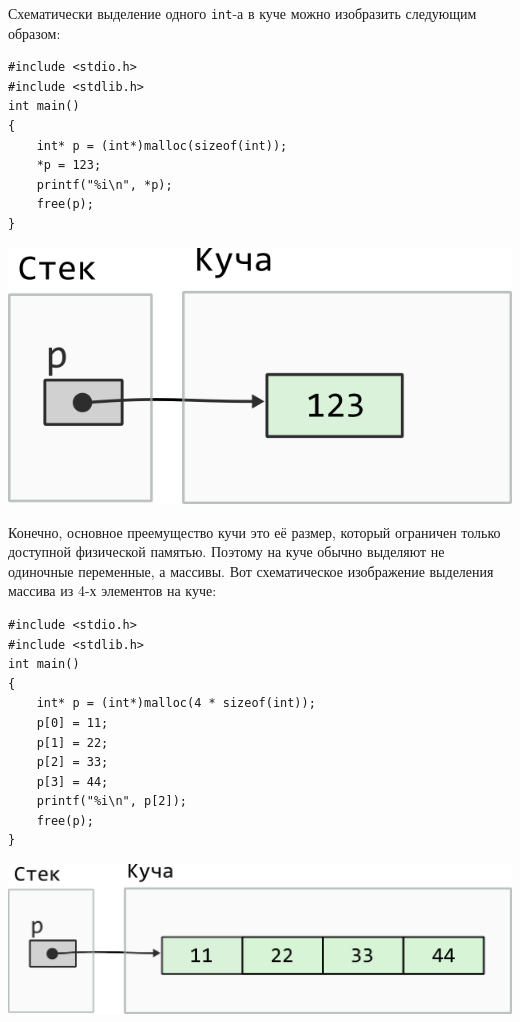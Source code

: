 \documentclass[10pt]{article}
\begin{document}
Схематически выделение одного \texttt{int}-а в куче можно изобразить следующим образом:
 
 
\noindent\begin{minipage}{.50\textwidth}
\begin{lstlisting}
#include <stdio.h>
#include <stdlib.h>
int main()
{
    int* p = (int*)malloc(sizeof(int));
    *p = 123;
    printf("%i\n", *p);
    free(p);
}
\end{lstlisting}
\end{minipage}\hfill
\begin{minipage}{.40\textwidth}
\includegraphics[scale=0.7]{../images/malloc_class_tasks/heap_int.png}
\end{minipage} 

Конечно, основное преемущество кучи это её размер, который ограничен только доступной физической памятью. Поэтому на куче обычно выделяют не одиночные переменные, а массивы. Вот схематическое изображение выделения массива из 4-х элементов на куче:\\
\noindent\begin{minipage}{.50\textwidth}
\begin{lstlisting}
#include <stdio.h>
#include <stdlib.h>
int main()
{
    int* p = (int*)malloc(4 * sizeof(int));
    p[0] = 11;
    p[1] = 22;
    p[2] = 33;
    p[3] = 44;
    printf("%i\n", p[2]);
    free(p);
}
\end{lstlisting}
\end{minipage}
\begin{minipage}{.40\textwidth}
\includegraphics[scale=0.68]{../images/malloc_class_tasks/heap_int_array.png}
\end{minipage}
\end{document}
